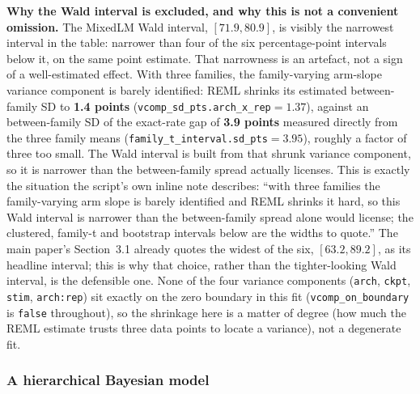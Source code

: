\documentclass[11pt]{article}
\begin{document}
\noindent\textbf{Why the Wald interval is excluded, and why this is not a
convenient omission.} The MixedLM Wald interval, $[71.9, 80.9]$, is visibly the
narrowest interval in the table: narrower than four of the six percentage-point
intervals below it, on the same point estimate. That narrowness is an artefact,
not a sign of a well-estimated effect. With three families, the family-varying
arm-slope variance component is barely identified: REML shrinks its estimated
between-family SD to \textbf{1.4 points}
(\texttt{vcomp\_sd\_pts.arch\_x\_rep}$=1.37$), against an between-family SD of
the exact-rate gap of \textbf{3.9 points} measured directly from the three family
means (\texttt{family\_t\_interval.sd\_pts}$=3.95$), roughly a factor of three
too small. The Wald interval is built from that shrunk variance component, so it
is narrower than the between-family spread actually licenses. This is exactly
the situation the script's own inline note describes: ``with three families the
family-varying arm slope is barely identified and REML shrinks it hard, so this
Wald interval is narrower than the between-family spread alone would license;
the clustered, family-t and bootstrap intervals below are the widths to quote.''
The main paper's Section~3.1 already quotes the widest of the six,
$[63.2,89.2]$, as its headline interval; this is why that choice, rather than
the tighter-looking Wald interval, is the defensible one. None of the four
variance components (\texttt{arch}, \texttt{ckpt}, \texttt{stim},
\texttt{arch:rep}) sit exactly on the zero boundary in this fit
(\texttt{vcomp\_on\_boundary} is \texttt{false} throughout), so the shrinkage
here is a matter of degree (how much the REML estimate trusts three data
points to locate a variance), not a degenerate fit.

\subsubsection{A hierarchical Bayesian model}
\end{document}
